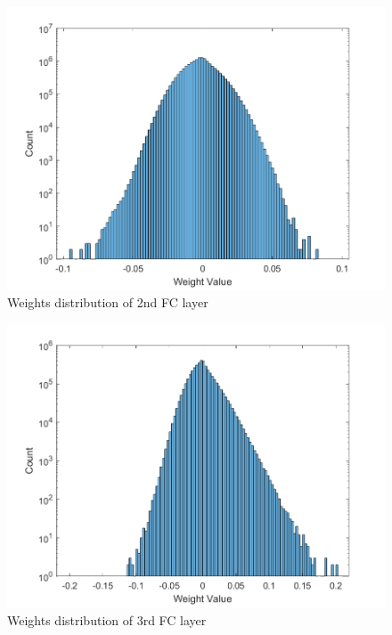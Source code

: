 \begin{figure} [H]
	\centering
	\includegraphics[scale=0.9]{Images/Weights-distributions/original/weight-distribution-FC2.png}
	\decoRule
	\caption[Weights distribution of 2nd FC layer]{Weights distribution of 2nd FC layer}
	\label{fig:weight-distribution-FC2}
\end{figure}

\begin{figure} [H]
	\centering
	\includegraphics[scale=0.9]{Images/Weights-distributions/original/weight-distribution-FC3.png}
	\decoRule
	\caption[Weights distribution of 3rd FC layer]{Weights distribution of 3rd FC layer}
	\label{fig:weights-distribution-FC3}
\end{figure}
